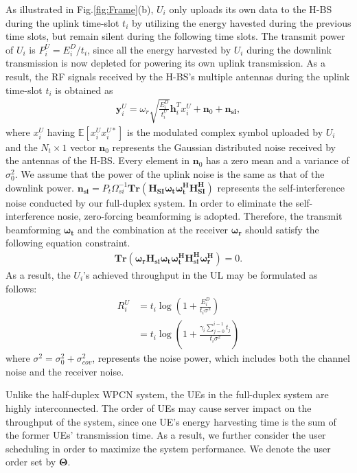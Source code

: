 \documentclass[12pt,draft,onecolumn,journal]{IEEEtran}
\begin{document}

As illustrated in Fig.\ref{fig:Frame}(b), $U_i$ only uploads its own data to the H-BS during the uplink time-slot $t_{i}$ by utilizing the energy havested during the previous time slots, but remain silent during the following time slots. The transmit power of $U_i$ is $P_i^{U} = E_{i}^D / t_{i}$, since all the energy harvested by $U_i$ during the downlink transmission is now depleted for powering its own uplink transmission. As a result, the RF signals received by the H-BS's multiple antennas during the uplink time-slot $t_i$ is obtained as
\begin{align}
\mathbf{y}_{i}^U = \omega_r\sqrt{\frac{E_{i}^D}{t_{i}^U}}\mathbf{h}_i^Tx_i^U + \mathbf{n}_0 + \mathbf{n_{si}},
\end{align}
where $x_i^U$ having $\mathbb{E}[x_i^Ux_i^{U*}]$ is the modulated complex symbol uploaded by $U_i$ and the $N_t\times 1$ vector $\mathbf{n}_0$ represents the Gaussian distributed noise received by the antennas of the H-BS. Every element in $\mathbf{n}_0$ has a zero mean and a variance of $\sigma_0^2$. We assume that the power of the uplink noise is the same as that of the downlink power. $\mathbf{n_{si}} = P_t\Omega_{si}^{-1}\mathbf{Tr(H_{SI}\omega_t\omega_t^HH_{SI}^H)}$ represents the self-interference noise conducted by our full-duplex system. In order to eliminate the self-interference nosie, zero-forcing beamforming is adopted. Therefore, the transmit beamforming $\mathbf{\omega_t}$ and the combination at the receiver $\mathbf{\omega_r}$ should satisfy the following equation constraint.
\begin{align}
\mathbf{Tr(\omega_rH_{si}\omega_t\omega_t^HH_{si}^H\omega_r^H)} = 0.
\end{align}
As a result, the $U_i$'s achieved throughput in the UL may be formulated as follows:
\begin{align}
R_i^U & = t_i\log(1 + \frac{E_i^D}{t_i\sigma^2}) \\
& = t_i\log(1 + \frac{\gamma_i\sum_{j=0}^{i-1}t_{j}}{t_i\sigma^2})
\end{align}
where $\sigma^2 = \sigma_0^2 + \sigma_{cov}^2$, represents the noise power, which includes both the channel noise and the receiver noise.

Unlike the half-duplex WPCN system, the UEs in the full-duplex system are highly interconnected. The order of UEs may cause server impact on the throughput of the system, since one UE's energy harvesting time is the sum of the former UEs' transmission time. As a result, we further consider the user scheduling in order to maximize the system performance. We denote the user order set by $\mathbf{\Theta}$.
\end{document}
